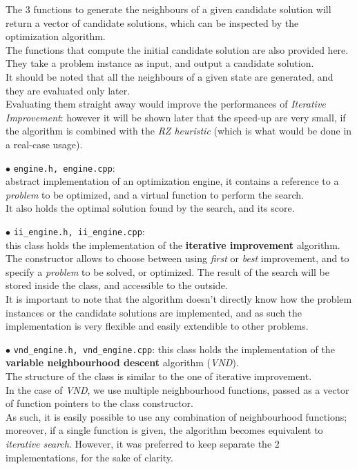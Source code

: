 \documentclass[
12pt,
a4paper,
oneside,
headinclude,
footinclude]{article}
\theoremstyle{definition} %
\begin{document}
The 3 functions to generate the neighbours of a given candidate solution will return a vector of candidate solutions, which can be inspected by the optimization algorithm.\\
The functions that compute the initial candidate solution are also provided here. 
They take a problem instance as input, and output a candidate solution.\\
It should be noted that all the neighbours of a given state are generated, and they are evaluated only later.\\
Evaluating them straight away would improve the performances of \textit{Iterative Improvement}: however it will be shown later that the speed-up are very small, if the algorithm is combined with the \textit{RZ heuristic} (which is what would be done in a real-case usage).

$\bullet$ \texttt{engine.h, engine.cpp}:\\
abstract implementation of an optimization engine, it contains a reference to a \textit{problem} to be optimized, and a virtual function to perform the search.\\
It also holds the optimal solution found by the search, and its score.

$\bullet$ \texttt{ii\_engine.h, ii\_engine.cpp}:\\
this class holds the implementation of the \textbf{iterative improvement} algorithm.\\
The constructor allows to choose between using \textit{first} or \textit{best} improvement, and to specify a \textit{problem} to be solved, or optimized.
The result of the search will be stored inside the class, and accessible to the outside.\\
It is important to note that the algorithm doesn't directly know how the problem instances or the candidate solutions are implemented, and as such the implementation is very flexible and easily extendible to other problems.

$\bullet$ \texttt{vnd\_engine.h, vnd\_engine.cpp}:
this class holds the implementation of the \textbf{variable neighbourhood descent} algorithm (\textit{VND}).\\
The structure of the class is similar to the one of iterative improvement.\\
In the case of \textit{VND}, we use multiple neighbourhood functions, passed as a vector of function pointers to the class constructor.\\
As such, it is easily possible to use any combination of neighbourhood functions; moreover, if a single function is given, the algorithm becomes equivalent to \textit{iterative search}. 
However, it was preferred to keep separate the 2 implementations, for the sake of clarity.
\end{document}
